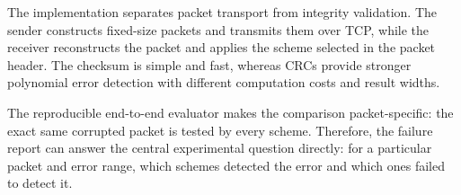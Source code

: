 \documentclass[12pt,a4paper]{article}
\begin{document}
The implementation separates packet transport from integrity validation. The
sender constructs fixed-size packets and transmits them over TCP, while the
receiver reconstructs the packet and applies the scheme selected in the
packet header. The checksum is simple and fast, whereas CRCs provide stronger
polynomial error detection with different computation costs and result
widths.

The reproducible end-to-end evaluator makes the comparison packet-specific:
the exact same corrupted packet is tested by every scheme. Therefore, the
failure report can answer the central experimental question directly: for a
particular packet and error range, which schemes detected the error and which
ones failed to detect it.
\end{document}
